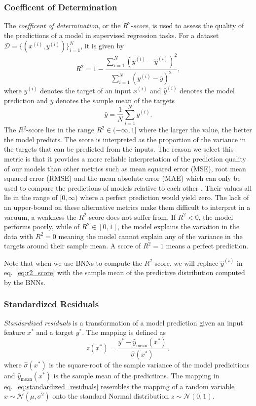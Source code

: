 \subsubsection{Coefficent of Determination}
The \textit{coefficent of determination}, or the $R^2$-\textit{score}, is used to assess the quality of the predictions of a model in supervised regression tasks. For a dataset $\mathcal{D} = \{(x^{(i)}, y^{(i)})\}_{i=1}^N$, it is given by
\begin{equation}\label{eq:r2_score}
    R^2 = 1 - \frac{\sum_{i=1}^N (y^{(i)} - \hat{y}^{(i)})^2}{\sum_{i=1}^N (y^{(i)} - \bar{y})^2},
\end{equation}
where $y^{(i)}$ denotes the target of an input $x^{(i)}$ and $\hat{y}^{(i)}$ denotes the model prediction and $\bar{y}$ denotes the sample mean of the targets
\begin{equation}
    \bar{y} = \frac{1}{N}\sum_{i=1}^N y^{(i)}.
\end{equation}
The $R^2$-score lies in the range $R^2 \in (-\infty, 1]$ where the larger the value, the better the model predicts. The score is interpreted as the proportion of the variance in the targets that can be predicted from the inputs. The reason we select this metric is that it provides a more reliable interpretation of the prediction quality of our models than other metrics such as mean squared error (MSE), root mean squared error (RMSE) and the mean absolute error (MAE) which can only be used to compare the predictions of models relative to each other \cite{r2_score}. Their values all lie in the range of $[0, \infty)$ where a perfect prediction would yield zero. The lack of an upper-bound on these alternative metrics make them difficult to interpret in a vacuum, a weakness the $R^2$-score does not suffer from. If $R^2 < 0$, the model performs poorly, while of $R^2 \in [0, 1]$, the model explains the variation in the data with $R^2 = 0$ meaning the model cannot explain any of the variance in the targets around their sample mean. A score of $R^2 = 1$ means a perfect prediction.

Note that when we use BNNs to compute the $R^2$-score, we will replace $\hat{y}^{(i)}$ in eq.~\eqref{eq:r2_score} with the sample mean of the predictive distribution computed by the BNNs. 

\subsubsection{Standardized Residuals}
\textit{Standardized residuals} is a transformation of a model prediction given an input feature $x^*$ and a target $y^*$. The mapping is defined as
\begin{equation}\label{eq:standardized_residuals}
    z(x^*) = \frac{y^* - \hat{y}_\text{mean}(x^*)}{\hat{\sigma}(x^*)},
\end{equation}
where $\hat{\sigma}(x^*)$ is the square-root of the sample variance of the model predicitions and $\hat{y}_\text{mean}(x^*)$ is the sample mean of the predictions. The mapping in eq.~\eqref{eq:standardized_residuals} resembles the mapping of a random variable $x \sim \mathcal{N}(\mu, \sigma^2)$ onto the standard Normal distribution $z \sim \mathcal{N}(0, 1)$.


